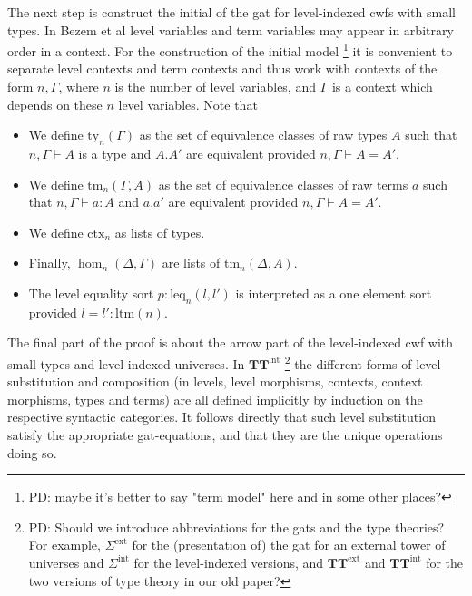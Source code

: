 \documentclass[11pt,a4paper]{article}
\theoremstyle{definition}
\newcommand{\UU}{\mathsf{U}}
\newcommand{\MB}[1]{{\color{red}{#1}}}
\def\UU{\mathsf{U}}
\def\ltm{\mathrm{ltm}}
\def\leq{\mathrm{leq}}
\newcommand{\ctx}{\mathrm{ctx}}
\newcommand{\ty}{\mathrm{ty}}
\newcommand{\tm}{\mathrm{tm}}
\newcommand{\Ta}{\mathrm{T}}
\def\TTint{\mathbf{TT}^\mathrm{int}}
\begin{document}
The next step is construct the initial of the gat for level-indexed cwfs with small types. In Bezem et al \cite{BezemCDE22} level variables and term variables may appear in arbitrary order in a context. For the construction of the initial model \footnote{PD: maybe it's better to say "term model" here and in some other places?} it is convenient to separate level contexts and term contexts and thus work with contexts of the form $n,\Gamma$, where $n$ is the number of level variables, and $\Gamma$ is a context which depends on these $n$ level variables. Note that 
\begin{itemize}
\item We define $\ty_n(\Gamma)$ as the set of equivalence classes of raw types $A$ such that $n, \Gamma \vdash A$ is a type and $A.A'$ are equivalent provided $n, \Gamma \vdash A = A'$.
\item We define $\tm_n(\Gamma,A)$ as the set of equivalence classes of raw terms $a$ such that $n, \Gamma \vdash a : A$ and $a.a'$ are equivalent provided $n, \Gamma \vdash A = A'$.
\item We define $\ctx_n$ as lists of types.
\item Finally, $\hom_n(\Delta,\Gamma)$ are lists of $\tm_n(\Delta,A)$.
\item The level equality sort $p : \leq_n(l,l')$ is interpreted as a one element sort provided $l = l' : \ltm(n)$.
\end{itemize}
 
The final part of the proof is about the arrow part of the level-indexed cwf with small types and level-indexed universes. In $\TTint$ \MB{explain} \footnote{PD: Should we introduce abbreviations for the gats and the type theories? For example, 
$\Sigma^\mathrm{ext}$ for the (presentation of) the gat for an external tower of universes and $\Sigma^\mathrm{int}$ for the level-indexed versions, and $\mathbf{TT^\mathrm{ext}}$ and $\mathbf{TT^\mathrm{int}}$ for the two versions of type theory in our old paper?} the different forms of level substitution and composition (in levels, level morphisms, contexts, context morphisms, types and terms) are all defined implicitly by induction on the respective syntactic categories. It follows directly that such level substitution satisfy the appropriate gat-equations, and that they are the unique operations doing so.

\end{document}
